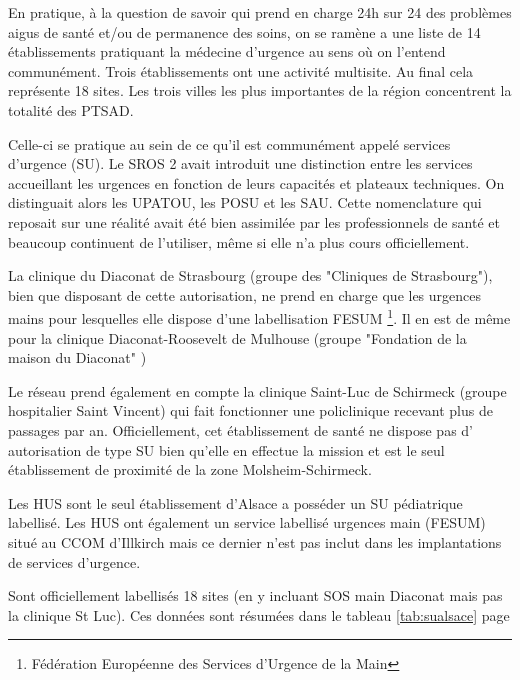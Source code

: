 \documentclass[12pt,english,french,twoside]{book}\usepackage[]{graphicx}\usepackage[]{color}
\begin{document}
En pratique, à la question de savoir qui prend en charge 24h sur 24 des problèmes aigus de santé et/ou de permanence des soins, on se ramène a une liste de 14 établissements pratiquant la médecine d'urgence au sens où on l'entend communément. Trois établissements ont une activité multisite. Au final cela représente 18 sites. Les trois villes les plus importantes de la région concentrent la totalité des PTSAD.

Celle-ci se pratique au sein de ce qu'il est communément appelé services d'urgence (SU). Le SROS 2 avait introduit une distinction entre les services accueillant les urgences en fonction de leurs capacités et plateaux techniques. On distinguait alors les UPATOU, les POSU et les SAU. Cette nomenclature qui reposait sur une réalité avait été bien assimilée par les professionnels de santé et beaucoup continuent de l'utiliser, même si elle n'a plus cours officiellement. 

La clinique du Diaconat de Strasbourg (groupe des "Cliniques de Strasbourg"), bien que disposant de cette autorisation, ne prend en charge que les urgences mains pour lesquelles elle dispose d'une labellisation FESUM \footnote{Fédération Européenne des Services d'Urgence de la Main}. Il en est de même pour la clinique Diaconat-Roosevelt de Mulhouse (groupe "Fondation de la maison du Diaconat" )

Le réseau prend également en compte la clinique Saint-Luc de Schirmeck (groupe hospitalier Saint Vincent) qui fait fonctionner une policlinique recevant plus de  passages par an. Officiellement, cet établissement de santé ne dispose pas d' autorisation de type SU bien qu'elle en effectue la mission et est le seul établissement de proximité de la zone Molsheim-Schirmeck.

Les HUS sont le seul établissement d'Alsace a posséder un SU pédiatrique labellisé. Les HUS ont également un service labellisé urgences main (FESUM) situé au CCOM d'Illkirch mais ce dernier n'est pas inclut dans les implantations de services d'urgence.

Sont officiellement labellisés 18 sites (en y incluant SOS main Diaconat mais pas la clinique St Luc). Ces données sont résumées dans le tableau \ref{tab:sualsace} page \pageref{tab:sualsace}
\end{document}
